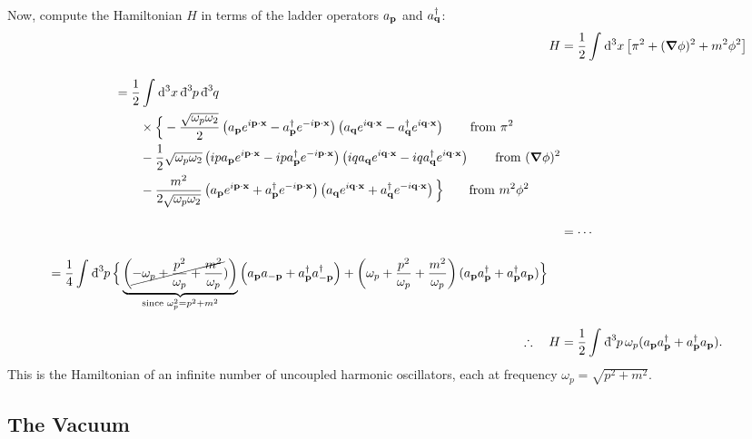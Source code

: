 Now, compute the Hamiltonian $H$ in terms of the ladder operators $a_{\vb{p}}$ and $a^{\dagger}_{\vb{q}}$:
\begin{align}
    H &= \frac{1}{2} \int_{}^{} \dd[3]{x} \left[ \pi^2 + (\grad \phi)^2 + m^2 \phi^2 \right] 
    \\[1em]
  \begin{split}
    &= \frac{1}{2} \int_{}^{} \dd[3]{x} \bdd[3]{p} \bdd[3]{q} \\
    & \qquad \times \Big\{ 
    -\frac{\sqrt{\omega_p \omega_2}}{2} \left( a_{\vb{p}} e^{i\vb{p}\cdot\vb{x}} - a^{\dagger}_{\vb{p}} e^{-i\vb{p}\cdot\vb{x}} \right)\left( a_{\vb{q}} e^{i\vb{q}\cdot\vb{x}} - a^{\dagger}_{\vb{q}} e^{i\vb{q}\cdot\vb{x}} \right) \qquad \text{from } \pi^2\\
    &\qquad-\frac{1}{2}\sqrt{\omega_p \omega_2} \left( i p a_{\vb{p}} e^{i\vb{p}\cdot\vb{x}} - ip a^{\dagger}_{\vb{p}} e^{-i\vb{p}\cdot\vb{x}} \right)
    \left(iq a_{\vb{q}} e^{i\vb{q}\cdot\vb{x}} - iqa^{\dagger}_{\vb{q}} e^{i\vb{q}\cdot\vb{x}} \right) \qquad \text{from } (\grad \phi)^2 \\
    &\qquad-\frac{m^2}{2\sqrt{\omega_p \omega_2}} \left( a_{\vb{p}} e^{i\vb{p}\cdot\vb{x}} + a^{\dagger}_{\vb{p}} e^{-i\vb{p}\cdot\vb{x}} \right)
    \left( a_{\vb{q}} e^{i\vb{q}\cdot\vb{x}} + a^{\dagger}_{\vb{q}} e^{-i\vb{q}\cdot\vb{x}} \right) \Big\} \qquad \text{from } m^2 \phi^2
  \end{split} 
  \\[1em]
  &= \cdots \nonumber
  \\[1em]
  \begin{split}
    &= \frac{1}{4} \int_{}^{} \bdd[3]{p} \Big\{ \underbrace{\left(\cancel{ -\omega_p + \frac{p^2}{\omega_p} + \frac{m^2}{\omega_p}})\right)}_{\text{since }\omega^2_p = p^2 + m^2} \left( a_{\vb{p}} a_{-\vb{p}} + a^{\dagger}_{\vb{p}} a_{-\vb{p}}^{\dagger} \right) + \left( \omega_p + \frac{p^2}{\omega_p} + \frac{m^2}{\omega_p} \right) (a_{\vb{p}} a^{\dagger}_{\vb{p}} + a^{\dagger}_{\vb{p}} a_{\vb{p}}) \Big\}
  \end{split}
  \\[1em]
  \therefore \quad H &= \frac{1}{2} \int_{}^{} \bdd[3]{p} \omega_p (a_{\vb{p}} a^{\dagger}_{\vb{p}} + a^{\dagger}_{\vb{p}} a_{\vb{p}}).
\end{align}
This is the Hamiltonian of an infinite number of uncoupled harmonic oscillators, each at frequency $\omega_p = \sqrt{p^2 + m^2}$.

\subsection{The Vacuum}%
\label{sub:the_vacuum}

